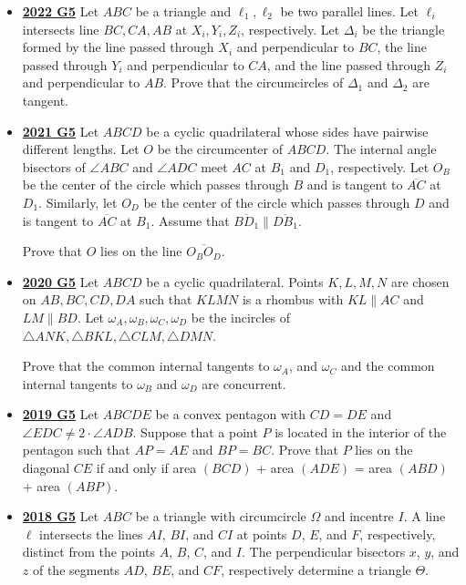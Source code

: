 \documentclass[11pt]{scrartcl}
\begin{document}
\begin{itemize}[leftmargin=*]
Prove that the circumcircles of triangles $BXD$ and $CYE$ have an intersection lie on line $AO$.
    \item  \href{https://artofproblemsolving.com/community/c6h3107344p28104319}{\textbf{2022 G5}} Let $ABC$ be a triangle and $\ell_1,\ell_2$ be two parallel lines. Let $\ell_i$ intersects line $BC,CA,AB$ at $X_i,Y_i,Z_i$, respectively. Let $\Delta_i$ be the triangle formed by the line passed through $X_i$ and perpendicular to $BC$, the line passed through $Y_i$ and perpendicular to $CA$, and the line passed through $Z_i$ and perpendicular to $AB$. Prove that the circumcircles of $\Delta_1$ and $\Delta_2$ are tangent.
\item \href{https://artofproblemsolving.com/community/c6h2882556p25627574}{\textbf{2021 G5}} Let $ABCD$ be a cyclic quadrilateral whose sides have pairwise different lengths. Let $O$ be the circumcenter of $ABCD$. The internal angle bisectors of $\angle ABC$ and $\angle ADC$ meet $AC$ at $B_1$ and $D_1$, respectively. Let $O_B$ be the center of the circle which passes through $B$ and is tangent to $\overline{AC}$ at $D_1$. Similarly, let $O_D$ be the center of the circle which passes through $D$ and is tangent to $\overline{AC}$ at $B_1$.
Assume that $\overline{BD_1} \parallel \overline{DB_1}$. 

Prove that $O$ lies on the line $\overline{O_BO_D}$.
\item \href{https://artofproblemsolving.com/community/c6h2625889p22698285}{\textbf{2020 G5}} 	Let $ABCD$ be a cyclic quadrilateral. Points $K, L, M, N$ are chosen on $AB, BC, CD, DA$ such that $KLMN$ is a rhombus with $KL \parallel AC$ and $LM \parallel BD$. Let $\omega_A, \omega_B, \omega_C, \omega_D$ be the incircles of $\triangle ANK, \triangle BKL, \triangle CLM, \triangle DMN$. 

Prove that the common internal tangents to $\omega_A$, and $\omega_C$ and the common internal tangents to $\omega_B$ and $\omega_D$ are concurrent.
\item \href{https://artofproblemsolving.com/community/c6h2279008p17828826}{\textbf{2019 G5}} Let $ABCDE$ be a convex pentagon with $CD= DE$ and $\angle EDC \ne 2 \cdot \angle ADB$.
Suppose that a point $P$ is located in the interior of the pentagon such that $AP =AE$ and $BP= BC$.
Prove that $P$ lies on the diagonal $CE$ if and only if area $(BCD)$ + area $(ADE)$ = area $(ABD)$ + area $(ABP)$.
\item \href{https://artofproblemsolving.com/community/c6h1876775p12752854}{\textbf{2018 G5}} Let $ABC$ be a triangle with circumcircle $\Omega$ and incentre $I$. A line $\ell$ intersects the lines $AI$, $BI$, and $CI$ at points $D$, $E$, and $F$, respectively, distinct from the points $A$, $B$, $C$, and $I$. The perpendicular bisectors $x$, $y$, and $z$ of the segments $AD$, $BE$, and $CF$, respectively determine a triangle $\Theta$. 


\end{itemize}
\end{document}
